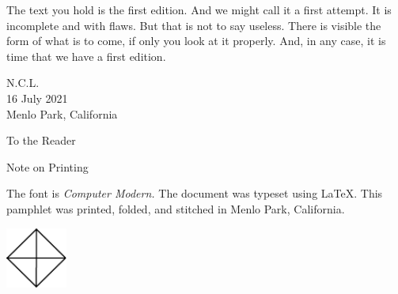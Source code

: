 The text you hold is the first edition.
And we might call it a first attempt.
It is incomplete and with flaws.
But that is not to say useless.
There is visible the form of what is to come, if only you look at it properly.
And, in any case, it is time that we have a first edition.

\begin{flushright}
N.C.L. \\
16 July 2021 \\
Menlo Park, California \\
\end{flushright}

\clearpage

\begin{center}
\vspace*{-1.5cm}
  \sf To the Reader
\end{center}



\clearpage

\tableofcontents

\clearpage




\clearpage

%
%

\blankpage

\begin{center}
\vspace*{-1.5cm}
  \sf Note on Printing
\end{center}
\noindent\noindent The font is \textit{Computer Modern.}
The document was typeset using \LaTeX.
This pamphlet was printed, folded, and stitched in Menlo Park, California.

\clearpage
\vspace*{\fill}
\begin{center}
\includegraphics[width=0.15\textwidth]{../trademark}
\end{center}
\vspace{\fill}
\thispagestyle{empty}


